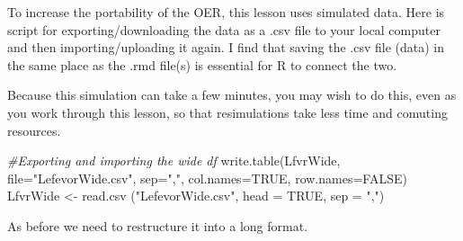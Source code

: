 \documentclass[
  english,
]{book}
\newenvironment{Shaded}{\begin{snugshade}}{\end{snugshade}}
\newcommand{\AttributeTok}[1]{\textcolor[rgb]{0.77,0.63,0.00}{#1}}
\newcommand{\CommentTok}[1]{\textcolor[rgb]{0.56,0.35,0.01}{\textit{#1}}}
\newcommand{\ConstantTok}[1]{\textcolor[rgb]{0.00,0.00,0.00}{#1}}
\newcommand{\FunctionTok}[1]{\textcolor[rgb]{0.00,0.00,0.00}{#1}}
\newcommand{\NormalTok}[1]{#1}
\newcommand{\OtherTok}[1]{\textcolor[rgb]{0.56,0.35,0.01}{#1}}
\newcommand{\StringTok}[1]{\textcolor[rgb]{0.31,0.60,0.02}{#1}}
\begin{document}
To increase the portability of the OER, this lesson uses simulated data. Here is script for exporting/downloading the data as a .csv file to your local computer and then importing/uploading it again. I find that saving the .csv file (data) in the same place as the .rmd file(s) is essential for R to connect the two.

Because this simulation can take a few minutes, you may wish to do this, even as you work through this lesson, so that resimulations take less time and comuting resources.

\begin{Shaded}
\begin{Highlighting}[]
\CommentTok{\#Exporting and importing the wide df}
\FunctionTok{write.table}\NormalTok{(LfvrWide, }\AttributeTok{file=}\StringTok{"LefevorWide.csv"}\NormalTok{, }\AttributeTok{sep=}\StringTok{","}\NormalTok{, }\AttributeTok{col.names=}\ConstantTok{TRUE}\NormalTok{, }\AttributeTok{row.names=}\ConstantTok{FALSE}\NormalTok{)}
\NormalTok{LfvrWide }\OtherTok{\textless{}{-}} \FunctionTok{read.csv}\NormalTok{ (}\StringTok{"LefevorWide.csv"}\NormalTok{, }\AttributeTok{head =} \ConstantTok{TRUE}\NormalTok{, }\AttributeTok{sep =} \StringTok{","}\NormalTok{)}
\end{Highlighting}
\end{Shaded}

As before we need to restructure it into a long format.
\end{document}
